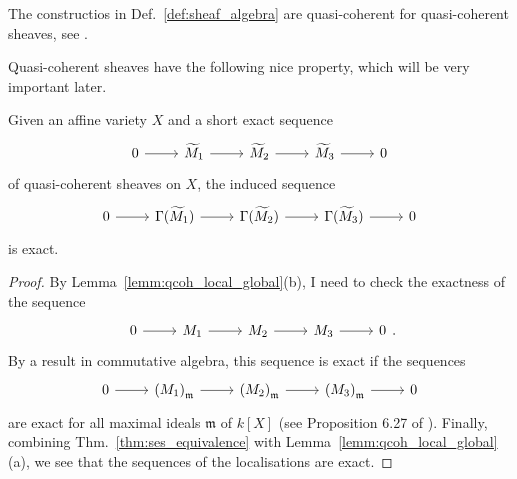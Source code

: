 \begin{rem}
  The constructios in Def.~\ref{def:sheaf_algebra} are quasi-coherent
  for quasi-coherent sheaves, see \cite{gathmann}.
\end{rem}
Quasi-coherent sheaves have the following nice property, which will be very
important later.
\begin{prop}\label{prop:qcoh_gsec_exact}
  Given an affine variety $X$ and a short exact sequence
  \[\begin{tikzcd}
      0\rar & \cm_{1}\rar & \cm_{2}\rar & \cm_{3}\rar & 0
    \end{tikzcd}\]
  of quasi-coherent sheaves on $X$, the induced sequence
  \[\begin{tikzcd}
      0\rar & \Gamma(\cm_{1})\rar & \Gamma(\cm_{2})\rar
      & \Gamma(\cm_{3})\rar & 0
    \end{tikzcd}\]
  is exact.
\end{prop}
\begin{proof}
  By Lemma~\ref{lemm:qcoh_local_global}(b), I need to check the exactness of
  the sequence
  \[\begin{tikzcd}
      0\rar & M_{1}\rar & M_{2}\rar & M_{3}\rar & 0
    \end{tikzcd}.\]
  By a result in commutative algebra, this sequence is exact if the sequences
  \[\begin{tikzcd}
      0\rar & \left(M_{1}\right)_{\mathfrak{m}}\rar
      & \left(M_{2}\right)_{\mathfrak{m}}\rar
      & \left(M_{3}\right)_{\mathfrak{m}}\rar & 0
    \end{tikzcd}\]
  are exact for all maximal ideals $\mathfrak{m}$ of $k[X]$
  (see Proposition 6.27 of \cite{gathmann_comm}). Finally, combining
  Thm.~\ref{thm:ses_equivalence} with Lemma~\ref{lemm:qcoh_local_global}(a),
  we see that the sequences of the localisations are exact.
\end{proof}
